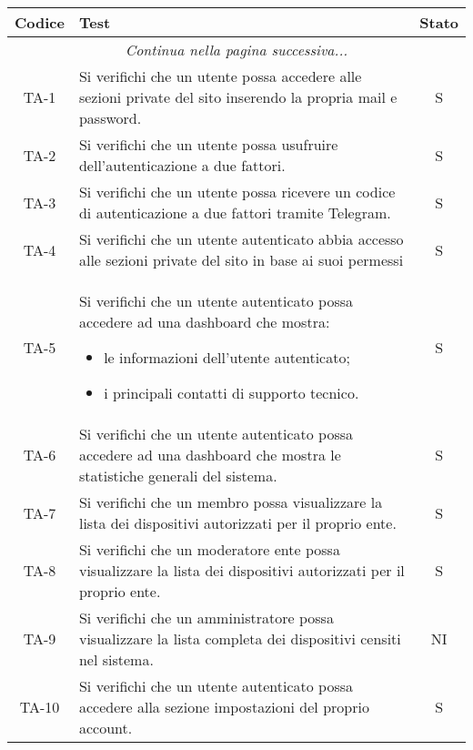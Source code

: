 		\begin{center}
			\begin{longtable}{|c|p{10cm}|c|}
			\hline
			\rowcolor{lighter-grayer}
			\textbf{Codice} & \textbf{Test} & \textbf{Stato}  \\
			\hline
			\endhead
			\hline
	        \multicolumn{3}{|c|}{\textit{Continua nella pagina successiva...}}\\
	        \hline
	        \endfoot
	        \endlastfoot

			\hline
			 TA-1 & Si verifichi che un utente possa accedere alle sezioni private del sito inserendo la propria mail e password.
			  & S \\
			 \hline
			 TA-2 & Si verifichi che un utente possa usufruire dell'autenticazione a due fattori. & S \\
			 \hline
			 TA-3 & Si verifichi che un utente possa ricevere un codice di autenticazione a due fattori tramite Telegram. & S \\
			 \hline
			 TA-4 & Si verifichi che un utente autenticato abbia accesso alle sezioni private del sito in base ai suoi permessi & S \\
			 \hline
			 TA-5 & Si verifichi che un utente autenticato possa accedere ad una dashboard che mostra:
			 \begin{itemize}
			 	\item le informazioni dell'utente autenticato;
			 	\item i principali contatti di supporto tecnico.
			 \end{itemize} & S \\
			 \hline
			 TA-6 & Si verifichi che un utente autenticato possa accedere ad una dashboard che mostra le statistiche generali del sistema. & S \\
			 \hline
			 TA-7 & Si verifichi che un membro possa visualizzare la lista dei dispositivi autorizzati per il proprio ente. & S \\
			 \hline
			 TA-8 & Si verifichi che un moderatore ente possa visualizzare la lista dei dispositivi autorizzati per il proprio ente. & S \\
			 \hline
			 TA-9 & Si verifichi che un amministratore possa visualizzare la lista completa dei dispositivi censiti nel sistema. & NI \\
			 \hline
			 TA-10 & Si verifichi che un utente autenticato possa accedere alla sezione impostazioni del proprio account. & S \\

\end{longtable}
\end{center}
